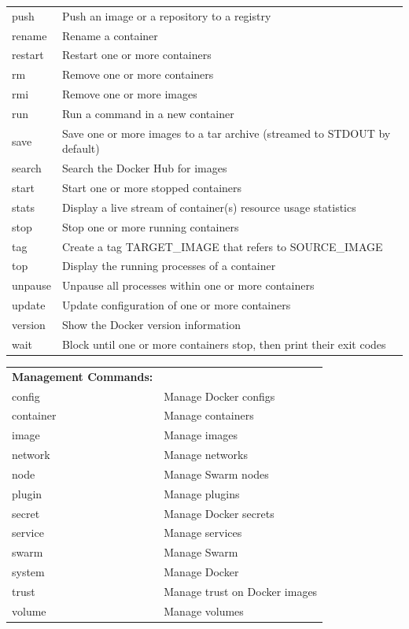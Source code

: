 \documentclass[a4paper]{article}
\begin{document}
{\begin{tabular} { >{\ttfamily}l  p{10cm} }
	push      &  Push an image or a repository to a registry \\
	rename    &  Rename a container \\
	restart   &  Restart one or more containers \\
	rm        &  Remove one or more containers \\
	rmi       &  Remove one or more images \\
	run       &  Run a command in a new container \\
	save      &  Save one or more images to a tar archive (streamed to STDOUT by default) \\
	search    &  Search the Docker Hub for images \\
	start     &  Start one or more stopped containers \\
	stats     &  Display a live stream of container(s) resource usage statistics \\
	stop      &  Stop one or more running containers \\
	tag       &  Create a tag TARGET\_IMAGE that refers to SOURCE\_IMAGE \\
	top       &  Display the running processes of a container \\
	unpause   &  Unpause all processes within one or more containers \\
	update    &  Update configuration of one or more containers \\
	version   &  Show the Docker version information \\
	wait      &  Block until one or more containers stop, then print their exit codes \\
\end{tabular}



\begin{tabular} { >{\ttfamily}l  p{9cm} }
\textbf{Management Commands:} & \\
config    &  Manage Docker configs \\
container &  Manage containers \\
image     &  Manage images \\
network   &  Manage networks \\
node      &  Manage Swarm nodes \\
plugin    &  Manage plugins \\
secret    &  Manage Docker secrets \\
service   &  Manage services \\
swarm     &  Manage Swarm \\
system    &  Manage Docker \\
trust     &  Manage trust on Docker images \\
volume    &  Manage volumes \\

\end{tabular}




}
\end{document}
